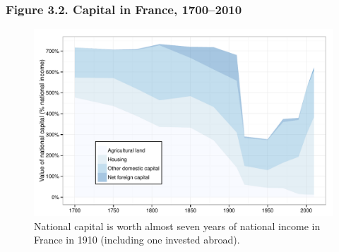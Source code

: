 \documentclass[t]{beamer}\usepackage[]{graphicx}\usepackage[]{color}
\newenvironment{knitrout}{}{} %
\begin{document}
\begin{frame}[label=Figure_3_2]
\frametitle{Figure 3.2. Capital in France, 1700--2010}
\begin{figure}[t]
\begin{minipage}[b]{\textwidth}
\centering
\begin{knitrout}\footnotesize
{}\color{fgcolor}

{\centering \includegraphics[width=1\linewidth]{figures/color/Figure_3_2} 

}



\end{knitrout}
\caption{National capital is worth almost seven years of national income in France in 1910 (including one invested abroad).}
\end{minipage}
\end{figure}
\end{frame}
\end{document}
